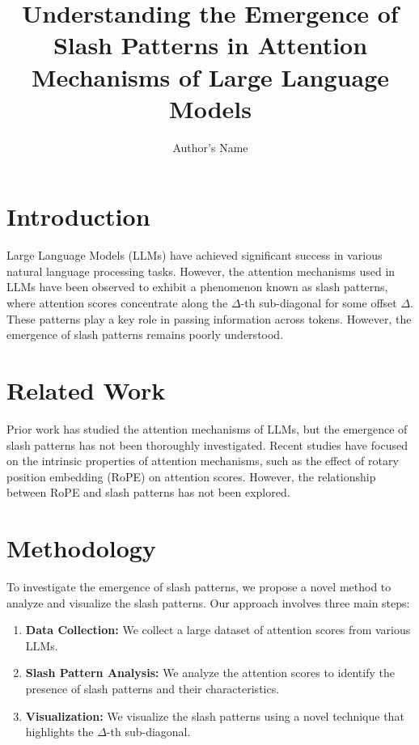 \documentclass[12pt]{article}
\title{Understanding the Emergence of Slash Patterns in Attention Mechanisms of Large Language Models}
\author{Author's Name}
\begin{document}
\maketitle

\section{Introduction}

Large Language Models (LLMs) have achieved significant success in various natural language processing tasks. However, the attention mechanisms used in LLMs have been observed to exhibit a phenomenon known as slash patterns, where attention scores concentrate along the $\Delta$-th sub-diagonal for some offset $\Delta$. These patterns play a key role in passing information across tokens. However, the emergence of slash patterns remains poorly understood.

\section{Related Work}

Prior work has studied the attention mechanisms of LLMs, but the emergence of slash patterns has not been thoroughly investigated. Recent studies have focused on the intrinsic properties of attention mechanisms, such as the effect of rotary position embedding (RoPE) on attention scores. However, the relationship between RoPE and slash patterns has not been explored.

\section{Methodology}

To investigate the emergence of slash patterns, we propose a novel method to analyze and visualize the slash patterns. Our approach involves three main steps:

\begin{enumerate}
    \item \textbf{Data Collection:} We collect a large dataset of attention scores from various LLMs.
    \item \textbf{Slash Pattern Analysis:} We analyze the attention scores to identify the presence of slash patterns and their characteristics.
    \item \textbf{Visualization:} We visualize the slash patterns using a novel technique that highlights the $\Delta$-th sub-diagonal.
\end{enumerate}
\end{document}

